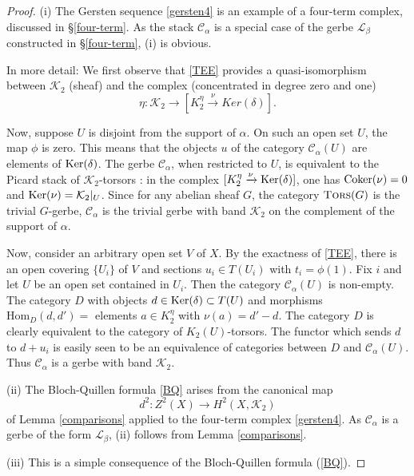 \documentclass{amsart}
\numberwithin{equation}{subsection}
\theoremstyle{remark}
\theoremstyle{remark}
\newcommand{\cC}{\mathcal{C}}
\newcommand{\cK}{\mathcal{K}}
\newcommand{\cL}{\mathcal{L}}
\DeclareMathOperator{\tors}{\textsc{Tors}} %
\begin{document}
\begin{proof}  (i) The Gersten sequence \eqref{gersten4} is an example of a four-term complex, discussed in \S \ref{four-term}. As the stack $\cC_{\alpha}$ is a special case of the gerbe $\cL_{\beta}$ constructed in \S \ref{four-term}, (i) is obvious. 

In more detail:  We first observe that \eqref{TEE} provides a quasi-isomorphism between $\cK_2$ (sheaf) and the complex (concentrated in degree zero and one)
\begin{equation}\label{eta}
\eta: \cK_2 \to [K_2^{\eta} \xrightarrow{\nu} Ker(\delta)].
\end{equation}
 
Now, suppose $U$ is disjoint from the support of $\alpha$. On such an open set $U$, the map $\phi$ is zero. This means that the objects $u$ of the category $\cC_{\alpha}(U)$ are elements of ${\rm Ker}(\delta)$. The gerbe $\cC_{\alpha}$, when restricted to $U$, is equivalent to  the Picard stack of $\cK_2$-torsors \cite[Expose XVIII, 1.4.15]{SGA4}: in the complex $[K_2^{\eta} \xrightarrow{\nu} {\rm Ker}(\delta)]$,  one has ${\rm Coker} (\nu) =0$ and ${\rm Ker}(\nu) =\cK_2|_U$. Since for any abelian sheaf $G$, the category $\tors(G)$ is the trivial $G$-gerbe, $\cC_{\alpha}$ is the trivial gerbe with band $\cK_2$ on the complement of the support of $\alpha$. 
 
Now, consider an arbitrary open set $V$ of $X$.  By the exactness of \eqref{TEE}, there is an open covering $\{U_i\}$ of $V$ and sections $u_i \in T(U_i)$ with $t_i = \phi(1)$. Fix $i$ and let $U$ be an open set contained in $U_i$. Then the category $\cC_{\alpha}(U)$ is non-empty. The category $D$ with objects $d\in {\rm Ker}(\delta) \subset T(U)$ and morphisms $\mathrm{Hom}_D(d,d')=$ elements $a \in K_2^{\eta}$ with $\nu(a) = d'-d$. The category $D$ is clearly equivalent to the category of $K_2(U)$-torsors. The functor which sends $d$ to $d +u_i$ is easily seen to be an equivalence of categories between $D$ and $\cC_{\alpha}(U)$.  Thus $\cC_{\alpha}$ is a gerbe with band $\cK_2$. 

(ii) The Bloch-Quillen formula \eqref{BQ} arises from the canonical map
\begin{equation*}
  d^2: Z^2(X) \to H^2(X, \cK_2)
\end{equation*}
of Lemma \ref{comparisons} applied to the four-term complex \eqref{gersten4}. As $\cC_{\alpha}$ is a gerbe of the form $\cL_{\beta}$, (ii) follows from Lemma \ref{comparisons}. 

(iii) This is a simple consequence of the Bloch-Quillen formula (\ref{BQ}).
\end{proof} 
\end{document}
